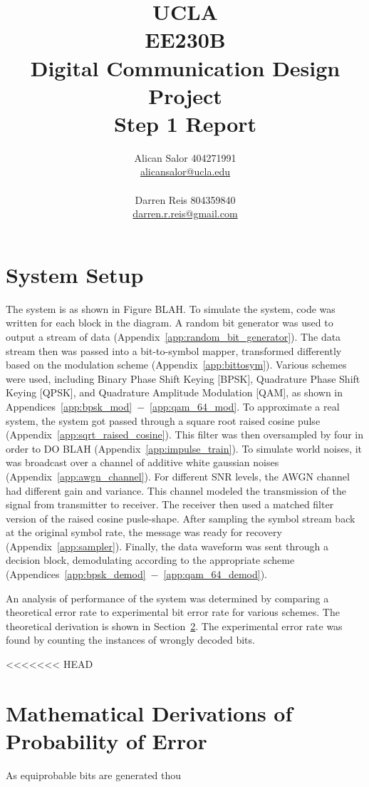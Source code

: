 \documentclass[]{article}
\title{UCLA\\EE230B\\Digital Communication Design Project\\Step 1 Report}
\author{Alican Salor 404271991 \\  \href{mailto:alicansalor@ucla.edu}{alicansalor@ucla.edu} \\ \\
Darren Reis 804359840 \\
\href{mailto:darrer.r.reis@gmail.com}{darren.r.reis@gmail.com} }
\begin{document}
\maketitle

\newpage
\tableofcontents

\newpage


\section{System Setup}
\label{sec:setup}
The system is as shown in Figure BLAH.  To simulate the system, code was written for each block in the diagram.  A random bit generator was used to output a stream of data (Appendix~\ref{app:random_bit_generator}).  The data stream then was passed into a bit-to-symbol mapper, transformed differently based on the modulation scheme (Appendix~\ref{app:bittosym}).  Various schemes were used, including Binary Phase Shift Keying [BPSK], Quadrature Phase Shift Keying [QPSK], and Quadrature Amplitude Modulation [QAM], as shown in Appendices~\ref{app:bpsk_mod}~$-$~\ref{app:qam_64_mod}. To approximate a real system, the system got passed through a square root raised cosine pulse (Appendix~\ref{app:sqrt_raised_cosine}).  This filter was then oversampled by four in order to DO BLAH (Appendix~\ref{app:impulse_train}).  To simulate world noises, it was broadcast over a channel of additive white gaussian noises (Appendix~\ref{app:awgn_channel}).  For different SNR levels, the AWGN channel had different gain and variance.  This channel modeled the transmission of the signal from transmitter to receiver.  The receiver then used a matched filter version of the raised cosine pusle-shape.  After sampling the symbol stream back at the original symbol rate, the message was ready for recovery (Appendix~\ref{app:sampler}).  Finally, the data waveform was sent through a decision block, demodulating according to the appropriate scheme (Appendices~\ref{app:bpsk_demod}~$-$~\ref{app:qam_64_demod}).  

An analysis of performance of the system was determined by comparing a theoretical error rate to experimental bit error rate for various schemes.  The theoretical derivation is shown in Section~\ref{sec:deriv}.  The experimental error rate was found by counting the instances of wrongly decoded bits.  

<<<<<<< HEAD
\section{Mathematical Derivations of Probability of Error}
\label{sec:deriv}
As equiprobable bits are generated thou
\end{document}
